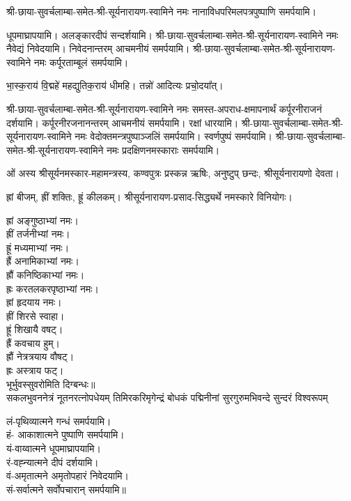 \begingroup
\setlength{\columnseprule}{1pt}
\let\chapt\sect

\endgroup


 श्री-छाया-सुवर्चलाम्बा-समेत-श्री-सूर्यनारायण-स्वामिने नमः नानाविध\-परिमल\-पत्र\-पुष्पाणि समर्पयामि।


\renewcommand{\devAya}{श्री-छाया-सुवर्चलाम्बा-समेत-श्री-सूर्यनारायण-स्वामिने नमः}

धूपमाघ्रापयामि। अलङ्कारदीपं सन्दर्शयामि।
\devAya{} नैवेद्यं निवेदयामि। निवेदनान्तरम् आचमनीयं समर्पयामि।
\devAya{} कर्पूरताम्बूलं समर्पयामि।

भा॒स्क॒राय॑ वि॒द्महे॑ महद्युतिक॒राय॑ धीमहि। 
तन्नो॑ आदित्यः प्रचो॒दया᳚त्। 

\devAya{} समस्त-अपराध-क्षमापनार्थं कर्पूरनीराजनं दर्शयामि। कर्पूरनीरजनानन्तरम् आचमनीयं समर्पयामि। रक्षां धारयामि।
\devAya{} वेदोक्तमन्त्रपुष्पाञ्जलिं समर्पयामि। स्वर्णपुष्पं समर्पयामि।
\devAya{} प्रदक्षिणनमस्काराः समर्पयामि।


ओं अस्य श्रीसूर्यनमस्कार-महामन्त्रस्य, कण्वपुत्रः प्रस्कन्न ऋषिः, अनुष्टुप् छन्दः, श्रीसूर्यनारायणो देवता।

ह्रां बीजम्, ह्रीं शक्तिः, ह्रूं कीलकम्। श्रीसूर्यनारायण-प्रसाद-सिद्ध्यर्थे नमस्कारे विनियोगः।

ह्रां अङ्गुष्ठाभ्यां नमः।\\
ह्रीं तर्जनीभ्यां नमः।\\
ह्रूं मध्यमाभ्यां नमः।\\
ह्रैं अनामिकाभ्यां नमः।\\
ह्रौं कनिष्ठिकाभ्यां नमः।\\
ह्रः करतलकरपृष्ठाभ्यां नमः।\\

ह्रां हृदयाय नमः।\\
ह्रीं शिरसे स्वाहा।\\
ह्रूं शिखायै वषट्।\\
ह्रैं कवचाय हुम्।\\
ह्रौं नेत्रत्रयाय वौषट्।\\
ह्रः अस्त्राय फट्।\\

भूर्भुवस्सुवरोमिति दिग्बन्धः॥\\

{सकलभुवननेत्रं नूतनरत्नोपधेयम्}
{तिमिरकरिमृगेन्द्रं बोधकं पद्मिनीनां}
{सुरगुरुमभिवन्दे सुन्दरं विश्वरूपम्}

लं-पृथिव्यात्मने गन्धं समर्पयामि।\\
हं- आकाशात्मने पुष्पाणि समर्पयामि।\\
यं-वाय्वात्मने धूपमाघ्रापयामि।\\
रं-वह्न्यात्मने दीपं दर्शयामि।\\
वं-अमृतात्मने अमृतोपहारं निवेदयामि।\\
सं-सर्वात्मने सर्वोपचारान् समर्पयामि॥\\



